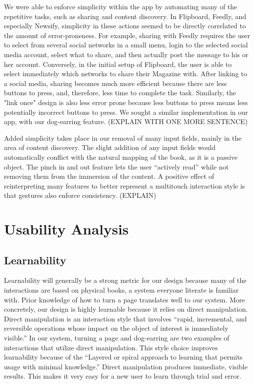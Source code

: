 \documentclass[11pt, oneside]{article}   	%
\begin{document}
We were able to enforce simplicity within the app by automating many of the repetitive tasks, such as sharing and content discovery. In Flipboard, Feedly, and especially Newsify, simplicity in these actions seemed to be directly correlated to the amount of error-proneness. For example, sharing with Feedly requires the user to select from several social networks in a small menu, login to the selected social media account, select what to share, and then actually post the message to his or her account. Conversely, in the initial setup of Flipboard, the user is able to select immediately which networks to share their Magazine with. After linking to a social media, sharing becomes much more efficient because there are less buttons to press, and, therefore, less time to complete the task. Similarly, the "link once" design is also less error prone because less buttons to press means less potentially incorrect buttons to press. We sought a similar implementation in our app, with our dog-earring feature. (EXPLAIN WITH ONE MORE SENTENCE)

Added simplicity takes place in our removal of many input fields, mainly in the area of content discovery. The slight addition of any input fields would automatically conflict with the natural mapping of the book, as it is a passive object. The pinch in and out feature lets the user ``actively read'' while not removing them from the immersion of the content. A positive effect of reinterpreting many features to better represent a multitouch interaction style is that gestures also enforce consistency. (EXPLAIN)

\section{Usability Analysis}

\subsection {Learnability}
Learnability will generally be a strong metric for our design because many of the interactions are based on physical books, a system everyone literate is familiar with. Prior knowledge of how to turn a page translates well to our system. More concretely, our design is highly learnable because it relies on direct manipulation. Direct manipulation is an interaction style that involves ``rapid, incremental, and reversible operations whose impact on the object of interest is immediately visible.'' \cite{Kwon} In our system, turning a page and dog-earring are two examples of interactions that utilize direct manipulation. This style choice improves learnability because of the ``Layered or spiral approach to learning that permits usage
with minimal knowledge.'' \cite{Kwon} Direct manipulation produces immediate, visible results. This makes it very easy for a new user to learn through trial and error.
\end{document}
